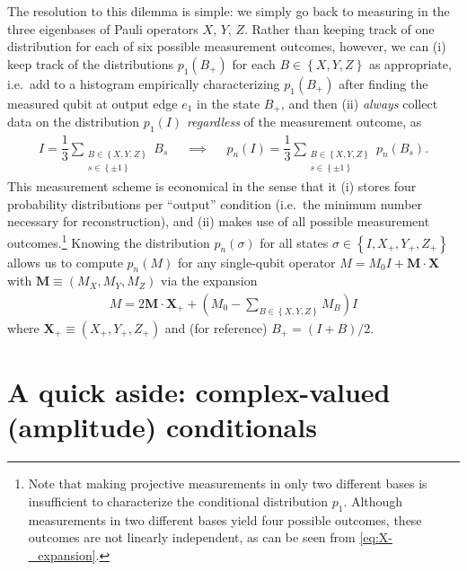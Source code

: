 \documentclass[nofootinbib,notitlepage,11pt]{revtex4-2}
\newcommand{\f}[2]{\dfrac{#1}{#2}} %
\newcommand{\p}[1]{\left(#1\right)} %
\renewcommand{\set}[1]{\left\{#1\right\}} %
\renewcommand{\v}{\bm} %
\renewcommand{\c}{\cdot} %
\begin{document}
The resolution to this dilemma is simple: we simply go back to
measuring in the three eigenbases of Pauli operators $X$, $Y$, $Z$.
Rather than keeping track of one distribution for each of six possible
measurement outcomes, however, we can (i) keep track of the
distributions $p_1\p{B_+}$ for each $B\in\set{X,Y,Z}$ as appropriate,
i.e.~add to a histogram empirically characterizing $p_1\p{B_+}$ after
finding the measured qubit at output edge $e_1$ in the state $B_+$,
and then (ii) {\it always} collect data on the distribution $p_1\p{I}$
{\it regardless} of the measurement outcome, as
\begin{align}
  I = \f13 \sum_{\substack{B\in\set{X,Y,Z}\\s\in\set{\pm1}}} B_s
  &&
  \implies
  &&
  p_n\p{I} = \f13 \sum_{\substack{B\in\set{X,Y,Z}\\s\in\set{\pm1}}}
  p_n\p{B_s}.
\end{align}
This measurement scheme is economical in the sense that it (i) stores
four probability distributions per ``output'' condition (i.e.~the
minimum number necessary for reconstruction), and (ii) makes use of
all possible measurement outcomes.\footnote{Note that making
  projective measurements in only two different bases is insufficient
  to characterize the conditional distribution $p_1$.  Although
  measurements in two different bases yield four possible outcomes,
  these outcomes are not linearly independent, as can be seen from
  \eqref{eq:X-_expansion}.}  Knowing the distribution $p_n\p{\sigma}$
for all states $\sigma\in\set{I,X_+,Y_+,Z_+}$ allows us to compute
$p_n\p{M}$ for any single-qubit operator $M = M_0 I + \v M\c\v X$ with
$\v M\equiv\p{M_X,M_Y,M_Z}$ via the expansion
\begin{align}
  M = 2 \v M\c\v X_+ + \p{ M_0 - \sum_{B\in\set{X,Y,Z}} M_B } I
\end{align}
where $\v X_+\equiv\p{X_+,Y_+,Z_+}$ and (for reference)
$B_+=\p{I+B}/2$.


\section{A quick aside: complex-valued (amplitude) conditionals}
\label{sec:amplitudes}
\end{document}
